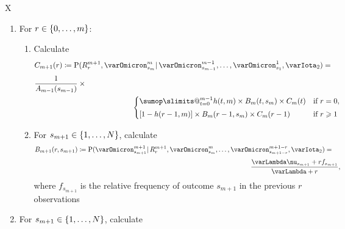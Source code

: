\documentclass[\ifafour a4paper,12pt,\else a5paper,10pt,\fi%
onecolumn,oneside,article,%
british%
]{memoir}
\makeatletter
\theoremstyle{remark}
\theoremstyle{innote}
\def\sum{\DOTSI\sumop\slimits@}
\newcommand*{\defd}{\coloneqq}
\renewcommand{\le}{\leqslant}%
\renewcommand{\ge}{\geqslant}%
\DeclarePairedDelimiter\set{\{}{\}}
\newcommand*{\p}{\mathrm{P}}%
\renewcommand*{\|}{\mathpunct{|}}
\newcommand*{\yff}{f}
\newcommand*{\yI}{\varIota}
\newcommand*{\yMc}{\yI_2}
\newcommand*{\yN}{\varLambda}
\newcommand*{\ynn}{\nu}
\newcommand*{\yrs}{h}
\makeatother
\begin{document}
\begin{table}[!p]
  \centering
  \caption{Predictive algorithm}
  \label{tab:adamsetal_algorithm}
  \begin{tabularx}{\textwidth}{X}\hline
    \begin{enumerate}
    \item\label{item:first_step}For $r \in \set{0,\dotsc, m}$:
      \begin{enumerate}[label*=\arabic*.]
      \item Calculate
        \[ \begin{multlined}[t][0.85\textwidth]
            C_{m+1}(r) \defd
            \p(R^{m+1}_{r} , \varOmicron^{m}_{s_{m}} \| \varOmicron^{m-1}_{s_{m-1}}, \dotsc,
            \varOmicron^{1}_{s_{1}}, \yMc) ={}\\[\jot]
       \shoveleft{\frac{1}{A_{m-1}(s_{m-1})} \times{}}\\\begin{cases}
          \sum_{t=0}^{m-1} \yrs(t,m) \times B_m(t,s_m) \times C_m(t) & \text{if $r=0$},
          \\[\jot]
          [1-\yrs(r-1,m)]  \times B_m(r-1,s_m) \times C_m(r-1)& \text{if $r\ge 1$}    
        \end{cases}
      \end{multlined}
    \]
      \item For $s_{m+1} \in \set{1,\dotsc,N}$, calculate
        \[ \begin{multlined}[][0.85\textwidth]
B_{m+1}(r,s_{m+1}) \defd \p(\varOmicron^{m+1}_{s_{m+1}} \| R^{m+1}_{r}, \varOmicron^{m}_{s_{m}},
          \dotsc, \varOmicron^{m+1-r}_{s_{m+1-r}}, \yMc) ={}\\[\jot]
         \frac{\yN\ynn_{s_{m+1}}+r\yff_{s_{m+1}}}{\yN + r},
       \end{multlined} \]
     where $\yff_{s_{m+1}}$ is the relative frequency of outcome $s_{m+1}$ in the previous $r$ observations
  \end{enumerate}
\item For $s_{m+1} \in \set{1,\dotsc,N}$, calculate

\end{enumerate}
\end{tabularx}
\end{table}
\end{document}
